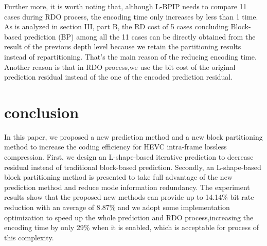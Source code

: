 \documentclass[journal]{IEEEtran}
\begin{document}
Further more, it is worth noting that, although L-BPIP needs to compare 11 cases during RDO process, the encoding time only increases by less than 1 time. As is analyzed in section III, part B, the RD cost of 5 cases concluding Block-based prediction (BP) among all the 11 cases can be directly obtained from the result of the previous depth level because we retain the partitioning results instead of repartitioning. That's the main reason of the reducing encoding time. Another reason is that in RDO process,we use the bit cost of the original prediction residual instead of the one of the encoded prediction residual.   
\section{conclusion}
In this paper, we proposed a new prediction method and a new block partitioning method to increase the coding efficiency for HEVC intra-frame lossless compression. First, we design an L-shape-based iterative prediction to decrease residual instead of traditional block-based prediction. Secondly, an L-shape-based block partitioning method is presented to take full advantage of the new prediction method and reduce mode information redundancy. The experiment results show that the proposed new methods can provide up to 14.14\% bit rate reduction with an average of 8.87\% and we adopt some implementation optimization to speed up the whole prediction and RDO process,increasing the encoding time by only 29\% when it is enabled, which is acceptable for process of this complexity.


\ifCLASSOPTIONcaptionsoff
  \newpage
\fi


\end{document}
